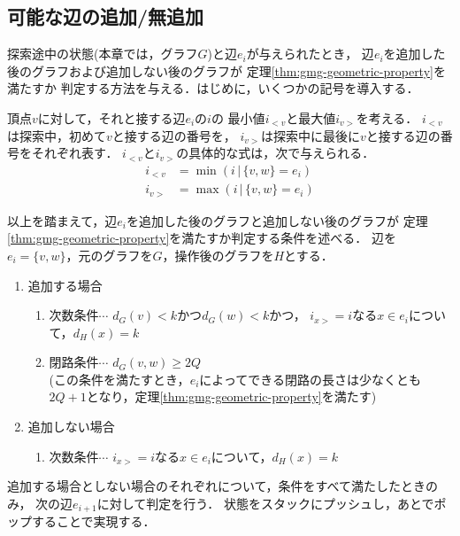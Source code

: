 \subsection{可能な辺の追加/無追加}
\label{subsect:feasible-edge-(no)-addition}
探索途中の状態(本章では，グラフ$G$)と辺$e_i$が与えられたとき，
辺$e_i$を追加した後のグラフおよび追加しない後のグラフが
定理\ref{thm:gmg-geometric-property}を満たすか
判定する方法を与える．はじめに，いくつかの記号を導入する．
\begin{definition}
  頂点$v$に対して，それと接する辺$e_i$の$i$の
  最小値$i_{<v}$と最大値$i_{v>}$を考える．
  $i_{<v}$は探索中，初めて$v$と接する辺の番号を，
  $i_{v>}$は探索中に最後に$v$と接する辺の番号をそれぞれ表す．
  $i_{<v}$と$i_{v>}$の具体的な式は，次で与えられる．
  \begin{equation}
    \label{eq:frontier}
    \begin{aligned}
    i_{<v} &= \min(i\,|\,\{v,w\}=e_i) \\
    i_{v>} &= \max(i\,|\,\{v,w\}=e_i)
    \end{aligned}
  \end{equation}
\end{definition}

以上を踏まえて，辺$e_i$を追加した後のグラフと追加しない後のグラフが
定理\ref{thm:gmg-geometric-property}を満たすか判定する条件を述べる．
辺を$e_i=\{v,w\}$，元のグラフを$G$，操作後のグラフを$H$とする．
\begin{enumerate}
\item 追加する場合
  \begin{enumerate}
  \item 次数条件$\cdots$ $d_G(v)<k$かつ$d_G(w)<k$かつ，
    $i_{x>}=i$なる$x\in e_i$について，$d_H(x)=k$
  \item 閉路条件$\cdots$ $d_G(v,w)\geq2Q$\\
    (この条件を満たすとき，$e_i$によってできる閉路の長さは少なくとも
    $2Q+1$となり，定理\ref{thm:gmg-geometric-property}を満たす)
  \end{enumerate}
\item 追加しない場合
  \begin{enumerate}
  \item 次数条件$\cdots$ $i_{x>}=i$なる$x\in e_i$について，$d_H(x)=k$
  \end{enumerate}
\end{enumerate}
追加する場合としない場合のそれぞれについて，条件をすべて満たしたときのみ，
次の辺$e_{i+1}$に対して判定を行う．
状態をスタックにプッシュし，あとでポップすることで実現する．

